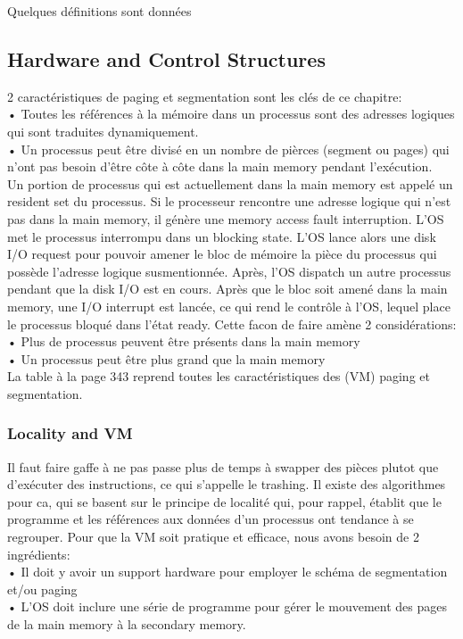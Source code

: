 Quelques définitions sont données \cite[p.~341]{stallings}
\subsection{Hardware and Control Structures}
2 caractéristiques de paging et segmentation sont les clés de ce chapitre: \\
• Toutes les références à la mémoire dans un processus sont des adresses logiques qui sont traduites dynamiquement.\\
• Un processus peut être divisé en un nombre de pièrces (segment ou pages) qui n'ont pas besoin d'être côte à côte dans la main memory pendant l'exécution.\\
Un portion de processus qui est actuellement dans la main memory est appelé un resident set du processus.
Si le processeur rencontre une adresse logique qui n'est pas dans la main memory, il génère une memory access fault interruption.
L'OS met le processus interrompu dans un blocking state.
L'OS lance alors une disk I/O request pour pouvoir amener le bloc de mémoire la pièce du processus qui possède l'adresse logique susmentionnée.
Après, l'OS dispatch un autre processus pendant que la disk I/O est en cours.
Après que le bloc soit amené dans la main memory, une I/O interrupt est lancée, ce qui rend le contrôle à l'OS, lequel place le processus bloqué dans l'état ready.
Cette facon de faire amène 2 considérations:\\
• Plus de processus peuvent être présents dans la main memory \\
• Un processus peut être plus grand que la main memory\\
La table à la page 343 reprend toutes les caractéristiques des (VM) paging et segmentation.
\subsubsection{Locality and VM}
Il faut faire gaffe à ne pas passe plus de temps à swapper des pièces plutot que d'exécuter des instructions, ce qui s'appelle le trashing.
Il existe des algorithmes pour ca, qui se basent sur le principe de localité qui, pour rappel, établit que le programme et les références aux données d'un processus ont tendance à se regrouper.
Pour que la VM soit pratique et efficace, nous avons besoin de 2 ingrédients:\\
• Il doit y avoir un support hardware pour employer le schéma de segmentation et/ou paging\\
• L'OS doit inclure une série de programme pour gérer le mouvement des pages de la main memory à la secondary memory.\\
